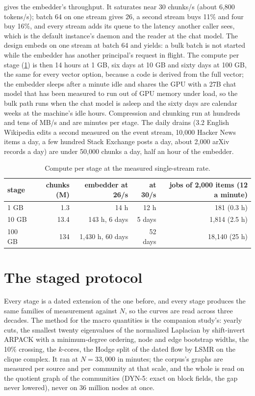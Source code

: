 \documentclass[11pt]{article}
\theoremstyle{plain}
\theoremstyle{definition}
\theoremstyle{remark}
\begin{document}
 gives the embedder's throughput. It saturates near 30 chunks/s (about 6,800
tokens/s); batch 64 on one stream gives 26, a second stream buys 11\% and four buy 16\%, and every
stream adds its queue to the latency another caller sees, which is the default instance's daemon
and the reader at the chat model. The design embeds on one stream at batch 64 and yields: a bulk
batch is not started while the embedder has another principal's request in flight. The compute per
stage (\cref{tab:compute}) is then 14 hours at 1 GB, six days at 10 GB and sixty days at 100 GB, the
same for every vector option, because a code is derived from the full vector; the embedder sleeps
after a minute idle and shares the GPU with a 27B chat model that has been measured to run out of
GPU memory under load, so the bulk path runs when the chat model is asleep and the sixty days are
calendar weeks at the machine's idle hours. Compression and chunking run at hundreds and tens of
MB/s and are minutes per stage. The daily drains (3.2 English Wikipedia edits a second measured on
the event stream, 10,000 Hacker News items a day, a few hundred Stack Exchange posts a day, about
2,000 arXiv records a day) are under 50,000 chunks a day, half an hour of the embedder.

\begin{table}[t]
\centering
\caption{Compute per stage at the measured single-stream rate.}\label{tab:compute}
\small
\begin{tabular}{lrrrr}
\toprule
stage & chunks (M) & embedder at 26/s & at 30/s & jobs of 2,000 items (12 a minute) \\
\midrule
1 GB & 1.3 & 14 h & 12 h & 181 (0.3 h) \\
10 GB & 13.4 & 143 h, 6 days & 5 days & 1,814 (2.5 h) \\
100 GB & 134 & 1,430 h, 60 days & 52 days & 18,140 (25 h) \\
\bottomrule
\end{tabular}
\end{table}

\section{The staged protocol}\label{sec:protocol}
Every stage is a dated extension of the one before, and every stage produces the same families of
measurement against $N$, so the curves are read across three decades. The method for the macro
quantities is the companion study's: yearly cuts, the smallest twenty eigenvalues of the normalized
Laplacian by shift-invert ARPACK with a minimum-degree ordering, node and edge bootstrap widths,
the 10\% crossing, the $k$-cores, the Hodge split of the dated flow by LSMR on the clique complex.
It ran at $N=33{,}000$ in minutes; the corpus's graphs are measured per source and per community at
that scale, and the whole is read on the quotient graph of the communities (DYN-5: exact on block
fields, the gap never lowered), never on 36 million nodes at once.
\end{document}
